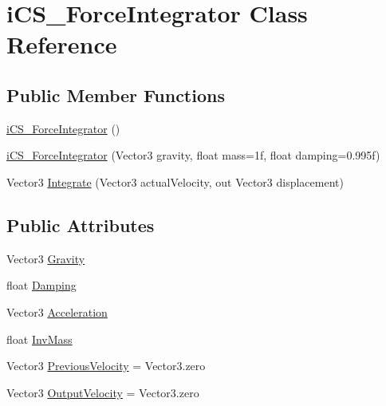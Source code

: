 \hypertarget{classi_c_s___force_integrator}{\section{i\+C\+S\+\_\+\+Force\+Integrator Class Reference}
\label{classi_c_s___force_integrator}
}
\subsection*{Public Member Functions}
\begin{DoxyCompactItemize}
\item 
\hyperlink{classi_c_s___force_integrator_aa81c94f25dc56cce305bdc50a07230be}{i\+C\+S\+\_\+\+Force\+Integrator} ()
\item 
\hyperlink{classi_c_s___force_integrator_abc3c21098ca5fe641bd0c1e0cda8e1a8}{i\+C\+S\+\_\+\+Force\+Integrator} (Vector3 gravity, float mass=1f, float damping=0.\+995f)
\item 
Vector3 \hyperlink{classi_c_s___force_integrator_af321c3d083c3a651e03db52ecae16177}{Integrate} (Vector3 actual\+Velocity, out Vector3 displacement)
\end{DoxyCompactItemize}
\subsection*{Public Attributes}
\begin{DoxyCompactItemize}
\item 
Vector3 \hyperlink{classi_c_s___force_integrator_a084a06cb73f3201769617838fbe001e0}{Gravity}
\item 
float \hyperlink{classi_c_s___force_integrator_a0460ab387e5f770a358842f84a61ce67}{Damping}
\item 
Vector3 \hyperlink{classi_c_s___force_integrator_a3e7ef7f501e1af14952a9a5c4f96fd72}{Acceleration}
\item 
float \hyperlink{classi_c_s___force_integrator_a8edc33516493f349b7e1054d38a5fa1d}{Inv\+Mass}
\item 
Vector3 \hyperlink{classi_c_s___force_integrator_a0b4b7119426703f30822dd445767adfc}{Previous\+Velocity} = Vector3.\+zero
\item 
Vector3 \hyperlink{classi_c_s___force_integrator_a2b16289c2a513d99cf5dbc035d71e39d}{Output\+Velocity} = Vector3.\+zero
\end{DoxyCompactItemize}
